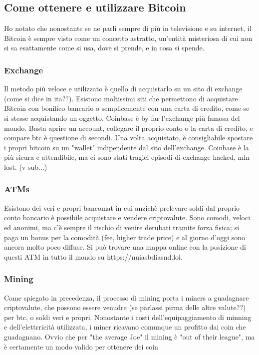 \documentclass {article}
\begin{document}
\subsection {Come ottenere e utilizzare Bitcoin}

Ho notato che nonostante se ne parli sempre di più in televisione e su internet, il Bitcoin è sempre visto come un concetto astratto, un'entità misteriosa di cui non si sa esattamente come si usa, dove si prende, e in cosa si spende.

\subsubsection {Exchange}

Il metodo più veloce e utilizzato è quello di acquistarlo su un sito di exchange (come si dice in ita??). Esistono moltissimi siti che permettono di acquistare Bitcoin con bonifico bancario o semplicemente con una carta di credito, come se si stesse acquistando un oggetto.
Coinbase è by far l'exchange più famosa del mondo. Basta aprire un account, collegare il proprio conto o la carta di credito, e compare btc è questione di secondi.
Una volta acquistato, è consigliabile spostare i propri bitcoin su un "wallet" indipendente dal sito dell'exchange. Coinbase è la più sicura e attendibile, ma ci sono stati tragici episodi di exchange hacked, mln lost. (v sub...)

\subsubsection {ATMs}

Esistono dei veri e propri bancomat in cui anzichè prelevare soldi dal proprio conto bancario è possibile acquistare e vendere criptovalute. Sono comodi, veloci ed anonimi, ma c'è sempre il rischio di venire derubati tramite forza fisica; si paga un bonus per la comodità (fee, higher trade price) e al giorno d'oggi sono ancora molto poco diffuse. Si può trovare una mappa online con la posizione di questi ATM in tutto il mondo su https://nuiasbdiasnd.lol.

\subsubsection {Mining}

Come spiegato in precedenza, il processo di mining porta i miners a guadagnare criptovalute, che possono essere venudre (se parlassi pirma delle altre valute??) per btc, o soldi veri e propri.
Nonostante i costi dell'equipaggiamento di minning e dell'elettrricità utilizzata, i miner ricavano comunque un profitto dai coin che guadagnano. Ovvio che per "the average Joe" il mining è "out of their league", ma è certamente un modo valido per ottenere dei coin
\end{document}
